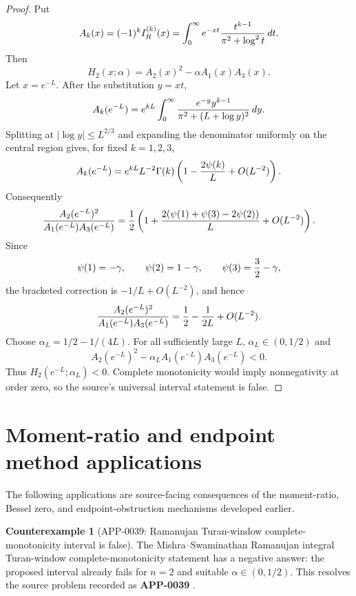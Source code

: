 \documentclass[11pt]{article}
\numberwithin{equation}{section}
\theoremstyle{definition}
\newtheorem{counterexample}[theorem]{Counterexample}
\theoremstyle{remark}
\newcommand{\1}{\mathbf 1}
\begin{document}
\begin{proof}
Put
\[
 A_k(x)=(-1)^kI_R^{(k)}(x)
 =\int_0^\infty e^{-xt}{t^{k-1}\over \pi^2+\log^2t}\,dt .
\]
Then
\[
 H_2(x;\alpha)=A_2(x)^2-\alpha A_1(x)A_3(x).
\]
Let \(x=e^{-L}\).  After the substitution \(y=xt\),
\[
 A_k(e^{-L})
 =
 e^{kL}\int_0^\infty
 {e^{-y}y^{k-1}\over \pi^2+(L+\log y)^2}\,dy .
\]
Splitting at \(|\log y|\le L^{2/3}\) and expanding the denominator uniformly
on the central region gives, for fixed \(k=1,2,3\),
\[
 A_k(e^{-L})
 =
 e^{kL}L^{-2}\Gamma(k)
 \left(1-{2\psi(k)\over L}+O(L^{-2})\right).
\]
Consequently
\[
 {A_2(e^{-L})^2\over A_1(e^{-L})A_3(e^{-L})}
 =
 {1\over2}
 \left(
 1+{2(\psi(1)+\psi(3)-2\psi(2))\over L}+O(L^{-2})
 \right).
\]
Since
\[
 \psi(1)=-\gamma,\qquad
 \psi(2)=1-\gamma,\qquad
 \psi(3)={3\over2}-\gamma,
\]
the bracketed correction is \(-1/L+O(L^{-2})\), and hence
\[
 {A_2(e^{-L})^2\over A_1(e^{-L})A_3(e^{-L})}
 =
 {1\over2}-{1\over2L}+O(L^{-2}).
\]
Choose \(\alpha_L=1/2-1/(4L)\).  For all sufficiently large \(L\),
\(\alpha_L\in(0,1/2)\) and
\[
 A_2(e^{-L})^2-\alpha_L A_1(e^{-L})A_3(e^{-L})<0.
\]
Thus \(H_2(e^{-L};\alpha_L)<0\).  Complete monotonicity would imply
nonnegativity at order zero, so the source's universal interval statement is
false.
\end{proof}

\section{Moment-ratio and endpoint method applications}
\label{sec:moment-ratio-endpoint-method-applications}
The following applications are source-facing consequences of the moment-ratio, Bessel zero, and endpoint-obstruction mechanisms developed earlier.

\begin{counterexample}[APP-0039: Ramanujan Turan-window complete-monotonicity interval is false]
\label{res:ramanujan-turan-window-negative-answer}
The Mishra--Swaminathan Ramanujan integral Turan-window complete-monotonicity statement has a negative answer: the proposed interval already fails for \(n=2\) and suitable \(\alpha\in(0,1/2)\).  This resolves the source problem recorded as \textbf{APP-0039} \cite{mishra-swaminathan-ramanujan}.
\end{counterexample}
\end{document}
